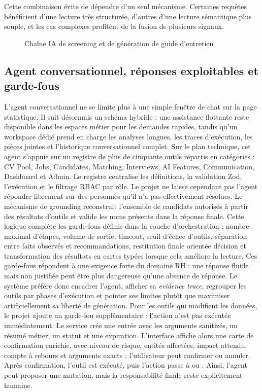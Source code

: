 Cette combinaison évite de dépendre d'un seul mécanisme. Certaines requêtes bénéficient d'une lecture très structurée, d'autres d'une lecture sémantique plus souple, et les cas complexes profitent de la fusion de plusieurs signaux.

\begin{figure}[H]
  \centering
  \caption{Chaîne IA de screening et de génération de guide d'entretien}
\end{figure}

\subsection{Agent conversationnel, réponses exploitables et garde-fous}
L'agent conversationnel ne se limite plus à une simple fenêtre de chat sur la page statistique. Il suit désormais un schéma hybride : une assistance flottante reste disponible dans les espaces métier pour les demandes rapides, tandis qu'un workspace dédié  prend en charge les analyses longues, les traces d'exécution, les pièces jointes et l'historique conversationnel complet.
Sur le plan technique, cet agent s'appuie sur un registre de plus de cinquante outils répartis en catégories : CV Pool, Jobs, Candidates, Matching, Interviews, AI Features, Communication, Dashboard et Admin. Le registre centralise les définitions, la validation Zod, l'exécution et le filtrage RBAC par rôle.
Le projet ne laisse cependant pas l'agent répondre librement sur des personnes qu'il n'a pas effectivement résolues. Le mécanisme de grounding reconstruit l'ensemble de candidats autorisés à partir des résultats d'outils et valide les noms présents dans la réponse finale. Cette logique complète les garde-fous définis dans la couche d'orchestration : nombre maximal d'étapes, volume de sortie, timeout, seuil d'échec d'outils, séparation entre faits observés et recommandations, restitution finale orientée décision et transformation des résultats en cartes typées lorsque cela améliore la lecture.
Ces garde-fous répondent à une exigence forte du domaine RH : une réponse fluide mais non justifiée peut être plus dangereuse qu'une absence de réponse. Le système préfère donc encadrer l'agent, afficher sa \textit{evidence trace}, regrouper les outils par phases d'exécution et pointer ses limites plutôt que maximiser artificiellement sa liberté de génération.
Pour les outils qui modifient les données, le projet ajoute un garde-fou supplémentaire : l'action n'est pas exécutée immédiatement. Le service  crée une entrée  avec les arguments sanitizés, un résumé métier, un statut  et une expiration. L'interface affiche alors une carte de confirmation enrichie, avec niveau de risque, entités affectées, impact attendu, compte à rebours et arguments exacts ; l'utilisateur peut confirmer ou annuler. Après confirmation, l'outil est exécuté, puis l'action passe à  ou . Ainsi, l'agent peut proposer une mutation, mais la responsabilité finale reste explicitement humaine.


